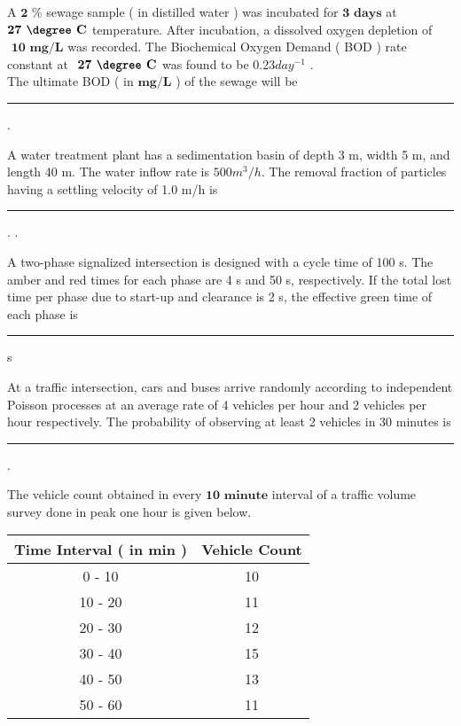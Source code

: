 	\item A $\textbf{2 \%}$ sewage sample ( in distilled water ) was incubated for $\textbf{3 days}$ at $\textbf{27 \degree C}$ temperature. After incubation, a dissolved oxygen depletion of $\textbf{ 10 mg/L}$ was recorded. The Biochemical Oxygen Demand ( BOD ) rate constant at $\textbf{ 27 \degree C}$ was found to be \textbf{ $0.23 day^{-1}$} . \\
		The ultimate BOD ( in $\textbf{mg/L}$ ) of the sewage will be \rule{1cm}{0.1pt}. 
	\item A water treatment plant has a sedimentation basin of depth 3 m, width 5 m, and length 40 m. The water inflow rate is $ 500 m^3/h $. The removal fraction of particles having a settling velocity of 1.0 m/h is \rule{1cm}{0.1pt} . . \\
	\item A two-phase signalized intersection is designed with a cycle time of 100 s. The amber and red times for each phase are 4 s and 50 s, respectively. If the total lost time per phase due to start-up and clearance is 2 s, the effective green time of each phase is \rule{1cm}{0.1pt} s 
	\item At a traffic intersection, cars and buses arrive randomly according to independent Poisson processes at an average rate of 4 vehicles per hour and 2 vehicles per hour respectively. The probability of observing at least 2 vehicles in 30 minutes is \rule{1cm}{0.1pt} . 
	\item The vehicle count obtained in every $\textbf{10 minute}$ interval of a traffic volume survey done in peak one hour is given below. \\
		\begin{table}
\centering
\begin{tabular}{|c|c|}
\hline
\textbf{Time Interval ( in min )} & \textbf{Vehicle Count} \\
\hline
0 - 10 & 10 \\
\hline
10 - 20 & 11 \\
\hline
20 - 30 & 12 \\
\hline
30 - 40 & 15 \\
\hline
40 - 50 & 13 \\
\hline
50 - 60 & 11 \\
\hline
\end{tabular}
\label{tab: Q_64}
\end{table}
